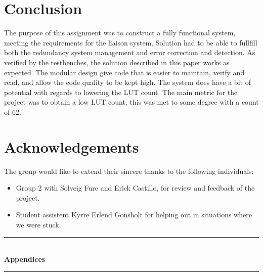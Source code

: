 \documentclass[a4paper]{IEEEtran}
\begin{document}
\section{Conclusion}
The purpose of this assignment was to construct a fully functional system, meeting the requirements for the liaison system.
Solution had to be able to fullfill both the redundancy system management and error correction and detection.
As verified by the testbenches, the solution described in this paper works as expected.
The modular design give code that is easier to maintain, verify and read, and allow the code quality to be kept high.
The system does have a bit of potential with regards to lowering the LUT count.
The main metric for the project was to obtain a low LUT count, this was met to some degree with a count of 62.

\section{Acknowledgements}
The group would like to extend their sincere thanks to the following individuals:
\begin{itemize}
    \item Group 2 with Solveig Fure and Erick Castillo, for review and feedback of the project.
    \item Student assistent Kyrre Erlend Gonsholt for helping out in situations where we were stuck.
\end{itemize}

\clearpage
\begin{titlepage}


\nocite{*}
\end{titlepage}

\clearpage
\begin{titlepage}
    \newcommand{\HRule}{\rule{\linewidth}{0.5mm}} %
    \center %
    \vspace*{3cm}
    \HRule \\[0.4cm]
    { \huge \bfseries Appendices}\\[0.4cm] %
    \HRule \\[1.5cm]
\end{titlepage}
\clearpage
\end{document}
